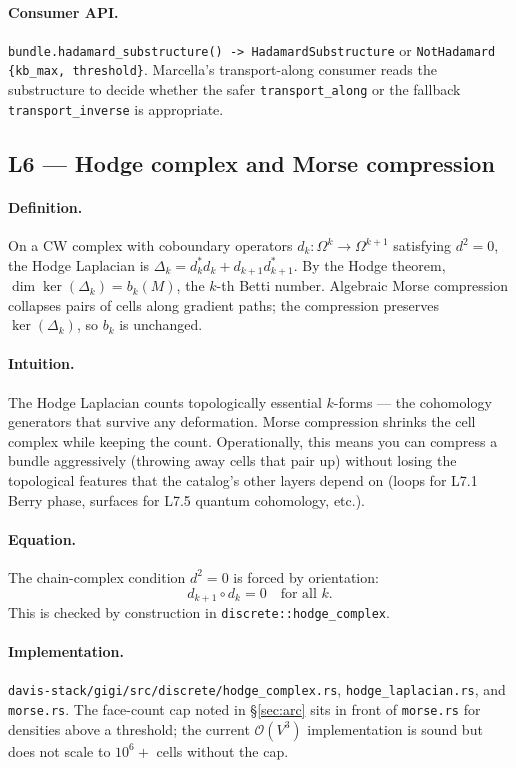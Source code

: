 \documentclass[11pt,letterpaper]{article}
\begin{document}
\paragraph{Consumer API.}
\texttt{bundle.hadamard\_substructure() -> HadamardSubstructure}
or \texttt{NotHadamard \{kb\_max, threshold\}}. Marcella's
transport-along consumer reads the substructure to decide whether
the safer \texttt{transport\_along} or the fallback
\texttt{transport\_inverse} is appropriate.


\subsection{L6 --- Hodge complex and Morse compression}

\paragraph{Definition.}
On a CW complex with coboundary operators
$d_k: \Omega^k \to \Omega^{k+1}$ satisfying $d^2 = 0$, the Hodge
Laplacian is $\Delta_k = d_k^* d_k + d_{k+1} d_{k+1}^*$. By the
Hodge theorem, $\dim \ker(\Delta_k) = b_k(M)$, the $k$-th Betti
number. Algebraic Morse compression collapses pairs of cells along
gradient paths; the compression preserves $\ker(\Delta_k)$, so
$b_k$ is unchanged.

\paragraph{Intuition.}
The Hodge Laplacian counts topologically essential $k$-forms ---
the cohomology generators that survive any deformation. Morse
compression shrinks the cell complex while keeping the count.
Operationally, this means you can compress a bundle aggressively
(throwing away cells that pair up) without losing the topological
features that the catalog's other layers depend on (loops for L7.1
Berry phase, surfaces for L7.5 quantum cohomology, etc.).

\paragraph{Equation.}
The chain-complex condition $d^2 = 0$ is forced by orientation:
\[
d_{k+1} \circ d_k = 0 \quad \text{for all } k.
\]
This is checked by construction in
\texttt{discrete::hodge\_complex}.

\paragraph{Implementation.}
\texttt{davis-stack/gigi/src/discrete/hodge\_complex.rs},
\texttt{hodge\_laplacian.rs}, and \texttt{morse.rs}. The face-count
cap noted in \S\ref{sec:arc} sits in front of \texttt{morse.rs} for
densities above a threshold; the current $\mathcal{O}(V^3)$
implementation is sound but does not scale to $10^6+$ cells without
the cap.
\end{document}
